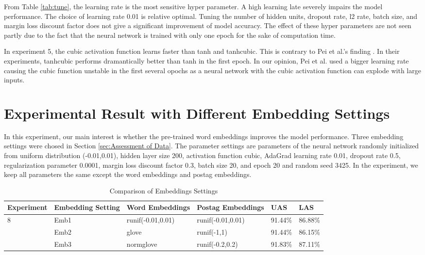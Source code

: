 From Table \ref{tab:tune}, the learning rate is the most sensitive hyper parameter. A high learning late severely impairs the model performance. The choice of learning rate 0.01 is relative optimal.
Tuning the number of hidden units, dropout rate, l2 rate, batch size, and margin loss discount factor does not give a significant improvement of model accuracy. The effect of these hyper parameters are not seen partly due to the fact that the neural network is trained with only one epoch for the sake of computation time.

In experiment 5, the cubic activation function learns faster than tanh and tanhcubic. This is contrary to Pei et al.'s finding \cite{pei2015}. In their experiments, tanhcubic performs dramantically better than tanh in the first epoch. In our opinion, Pei et al. used a bigger learning rate causing the cubic function unstable in the first several opochs as a neural network with the cubic activation function can explode with large inputs.  

\section{Experimental Result with Different Embedding Settings}
In this experiment, our main interest is whether the pre-trained word embeddings improves the model performance. Three embedding settings were chosed in Section \ref{sec:Assessment of Data}. The parameter settings are parameters of the neural network randomly initialized from uniform distribution (-0.01,0.01), hidden layer size 200, activation function cubic, AdaGrad learning rate 0.01, dropout rate 0.5, regularization parameter 0.0001, margin loss discount factor 0.3, batch size 20, and epoch 20 and random seed 3425. In the experiment, we keep all parameters the same except the word embeddings and postag embeddings. 
\begin{table}
\centering
    \begin{tabular}{@{}l|p{2cm} l l l l@{}} \toprule
    Experiment&Embedding Setting&Word Embeddings& Postag Embeddings& UAS & LAS \\  \midrule
    8&Emb1&runif(-0.01,0.01)&runif(-0.01,0.01)&91.44\% &86.88\% \\  
    &Emb2&glove&runif(-1,1)&91.44\% &86.15\% \\  
    &Emb3&normglove&runif(-0.2,0.2)&91.83\% &87.11\% \\
    \bottomrule
    \end{tabular}
\caption{Comparison of Embeddings Settings}\label{tab:expemb}
\end{table}

